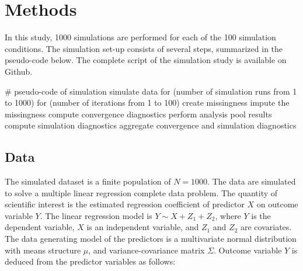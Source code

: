 \documentclass[article]{jss}
\begin{document}
% 
% 



\section{Methods} \label{sec:methods}

In this study, 1000 simulations are performed for each of the 100 simulation conditions. The simulation set-up consists of several steps, summarized in the pseudo-code below. The complete  script of the simulation study is available on Github.

\begin{Code}
# pseudo-code of simulation 
simulate data 
for (number of simulation runs from 1 to 1000)
  for (number of iterations from 1 to 100)
    create missingness
    impute the missingness
    compute convergence diagnostics
    perform analysis
    pool results
    compute simulation diagnostics
aggregate convergence and simulation diagnostics
\end{Code}

\subsection{Data}
The simulated dataset is a finite population of $N=1000$. The data are simulated to solve a multiple linear regression complete data problem. The quantity of scientific interest is the estimated regression coefficient of predictor $X$ on outcome variable $Y$. The linear regression model is $Y \sim X+Z_1+Z_2$, where $Y$ is the dependent variable, $X$ is an independent variable, and $Z_1$ and $Z_2$ are covariates. The data generating model of the predictors is a multivariate normal distribution with means structure $\mu$, and variance-covariance matrix $\Sigma$. Outcome variable $Y$ is deduced from the predictor variables as follows:
\end{document}
